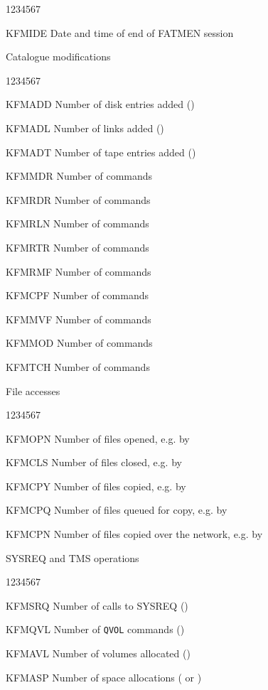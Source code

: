 \begin{OL}
\begin{DLtt}{1234567}
\item[KFMIDE]Date and time of end of FATMEN session
\end{DLtt}
\item
Catalogue modifications
\begin{DLtt}{1234567}
\item[KFMADD]Number of disk entries added ()
\item[KFMADL]Number of links added ()
\item[KFMADT]Number of tape entries added ()
\item[KFMMDR]Number of  commands
\item[KFMRDR]Number of  commands
\item[KFMRLN]Number of  commands
\item[KFMRTR]Number of  commands
\item[KFMRMF]Number of  commands
\item[KFMCPF]Number of  commands
\item[KFMMVF]Number of  commands
\item[KFMMOD]Number of  commands
\item[KFMTCH]Number of  commands
\end{DLtt}
\item
File accesses
\begin{DLtt}{1234567}
\item[KFMOPN]Number of files opened, e.g. by 
\item[KFMCLS]Number of files closed, e.g. by 
\item[KFMCPY]Number of files copied, e.g. by 
\item[KFMCPQ]Number of files queued for copy, e.g. by 
\item[KFMCPN]Number of files copied over the network, e.g. by 
\end{DLtt}
\item
SYSREQ and TMS operations
\begin{DLtt}{1234567}
\item[KFMSRQ]Number of calls to SYSREQ ()
\item[KFMQVL]Number of {\tt QVOL} commands ()
\item[KFMAVL]Number of volumes allocated ()
\item[KFMASP]Number of space allocations ( or )

\end{DLtt}
\end{OL}
